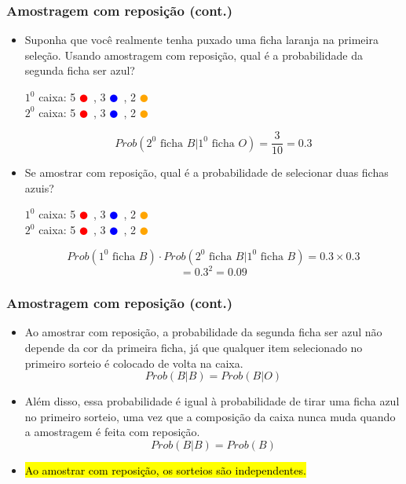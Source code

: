 
\begin{frame}
\frametitle{Amostragem com reposição (cont.)}

\begin{itemize}
\justifying
\item Suponha que você realmente tenha puxado uma ficha laranja na primeira seleção. Usando amostragem  com reposição, qual é a probabilidade da segunda ficha ser azul?

\pause

\begin{center}
$1^{0}$ caixa: 5 \textcolor{red}{$\CIRCLE$}~, 3 \textcolor{blue}{$\CIRCLE$}~, 2 \textcolor{orange}{$\CIRCLE$} \\
\pause
$2^{0}$ caixa: 5 \textcolor{red}{$\CIRCLE$}~, 3 \textcolor{blue}{$\CIRCLE$}~, 2 \textcolor{orange}{$\CIRCLE$}
\end{center}
\pause
\[ Prob(2^{0} \text{ ficha } B | 1^{0} \text{ ficha } O) = \frac{3}{10} = 0.3 \]

\pause
\justifying
\item Se amostrar com reposição, qual é a probabilidade de selecionar duas fichas azuis?
\begin{center}

\pause
$1^{0}$ caixa: 5 \textcolor{red}{$\CIRCLE$}~, 3 \textcolor{blue}{$\CIRCLE$}~, 2 \textcolor{orange}{$\CIRCLE$} \\
$2^{0}$ caixa: 5 \textcolor{red}{$\CIRCLE$}~, 3 \textcolor{blue}{$\CIRCLE$}~, 2 \textcolor{orange}{$\CIRCLE$}
\end{center}
\pause
\vspace{0.5cm}
\[ Prob(1^{0} \text{ ficha } B) \cdot Prob(2^{0} \text{ ficha } B | 1^{0} \text{ ficha } B) = 0.3 \times 0.3 \]
\[ = 0.3^2 = 0.09 \]

\end{itemize}

\end{frame}


\begin{frame}
\frametitle{Amostragem com reposição (cont.)}

\begin{itemize}
\justifying
\item Ao amostrar com reposição, a probabilidade da segunda ficha ser azul não depende da cor da primeira ficha, já que qualquer item selecionado no primeiro sorteio é colocado de volta na caixa.
\[ Prob(B | B) = Prob(B | O) \]
\justifying
\item Além disso, essa probabilidade é igual à probabilidade de tirar uma ficha azul no primeiro sorteio, uma vez que a composição da caixa nunca muda quando a amostragem é feita com reposição.
\[ Prob(B | B) = Prob(B) \]
\justifying
\item \hl{Ao amostrar com reposição, os sorteios são independentes.}

\end{itemize}

\end{frame}


